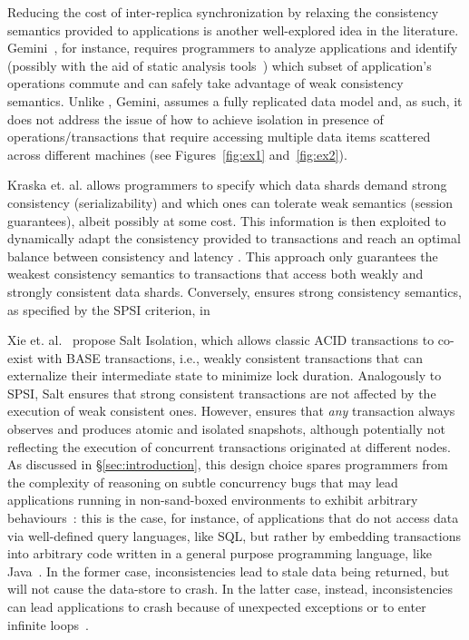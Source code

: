 Reducing the cost of inter-replica synchronization by relaxing the consistency semantics  provided to applications is another well-explored idea in the literature. Gemini~\cite{li2012making}, for instance, requires programmers to analyze applications and identify (possibly with the aid of static analysis tools~\cite{atc-rodrigo}) which subset of application's operations commute and can safely take advantage of weak consistency semantics.  Unlike \specula, Gemini, assumes a fully replicated data model and, as such, it does not address the issue of how to achieve isolation in presence of operations/transactions that require accessing  multiple data items scattered across different machines (see Figures~\ref{fig:ex1} and~\ref{fig:ex2}). 

Kraska et. al. allows programmers to specify which data shards demand strong consistency (serializability)  and which ones can  tolerate weak semantics (session guarantees), albeit possibly at some cost. This information is then exploited to dynamically adapt the consistency provided to transactions and reach an optimal balance between consistency and latency \cite{kraska2009consistency}. This approach only guarantees the weakest consistency semantics to transactions that access both weakly and strongly consistent data shards. Conversely, \specula ensures strong consistency semantics, as specified by the SPSI criterion, in 

Xie et. al.~\cite{xie2014salt} propose Salt Isolation, which allows classic ACID transactions to co-exist with BASE transactions, i.e., weakly consistent transactions that can externalize their intermediate state to minimize lock duration. Analogously to SPSI, Salt ensures that strong consistent transactions are not affected by the execution of weak consistent ones. However,  \specula ensures that \textit{any} transaction always observes and produces atomic and isolated snapshots, although potentially not reflecting the execution of concurrent transactions originated at different nodes. As discussed in \S \ref{sec:introduction}, this design choice spares programmers from the complexity of reasoning on subtle concurrency bugs that may lead applications running in non-sand-boxed environments  to exhibit arbitrary behaviours~\cite{opacity, virtualWorldConsistency}: this is the case, for instance, of applications that do not access data via well-defined query languages, like SQL, but rather by embedding transactions into arbitrary code written in a general purpose programming language, like Java~\cite{javaPersistenceAPI}. In the former case, inconsistencies lead to stale data being returned, but will not cause the data-store to crash. In the latter case, instead, inconsistencies can lead applications to crash because of unexpected exceptions or to enter infinite loops~\cite{transactionsAreBackButTheyAreNotTheSame}. 


